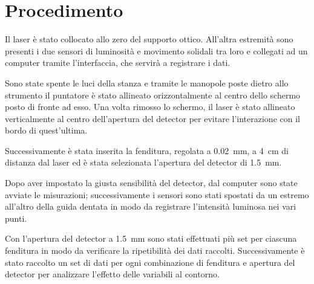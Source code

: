 \documentclass[../main.tex]{subfiles}
\begin{document}
\section{Procedimento}

Il laser è stato collocato allo zero del supporto ottico. All’altra estremità sono presenti i due sensori di luminosità e movimento solidali tra loro e collegati ad un computer tramite l’interfaccia, che servirà a registrare i dati.

Sono state spente le luci della stanza e tramite le manopole poste dietro allo strumento il puntatore è stato allineato orizzontalmente al centro dello schermo posto di fronte ad esso. Una volta rimosso lo schermo, il laser è stato allineato verticalmente al centro dell'apertura del detector per evitare l'interazione con il bordo di quest'ultima.

Successivamente è stata inserita la fenditura, regolata a \qty{0.02}{\milli\meter}, a \qty{4}{\centi\meter} di distanza dal laser ed è stata selezionata l’apertura del detector di \qty{1.5}{\milli\meter}.

Dopo aver impostato la giusta sensibilità del detector, dal computer sono state avviate le misurazioni; successivamente i sensori sono stati spostati da un estremo all’altro della guida dentata in modo da registrare l'intensità luminosa nei vari punti.

Con l'apertura del detector a \qty{1.5}{\milli\meter} sono stati effettuati più set per ciascuna fenditura in modo da verificare la ripetibilità dei dati raccolti. Successivamente è stato raccolto un set di dati per ogni combinazione di fenditura e apertura del detector per analizzare l'effetto delle variabili al contorno.


\end{document}
